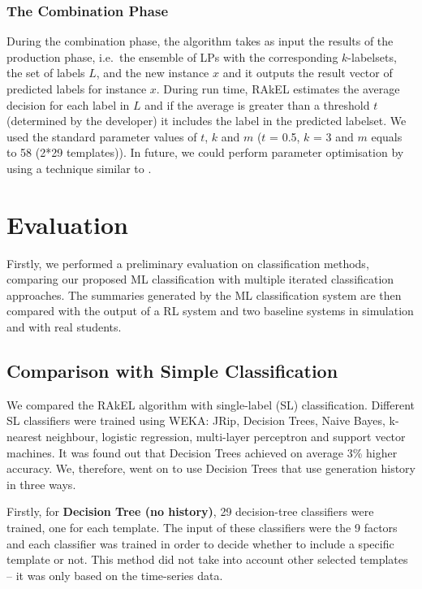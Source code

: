 \documentclass[11pt]{article}
\begin{document}
\subsubsection{The Combination Phase}

During the combination phase, the algorithm takes as input the results of the production phase, i.e.\ 
the ensemble of LPs with the corresponding $k$-labelsets, the set of labels $L$, and the new instance 
$x$ and it outputs the result vector of predicted labels for instance $x$. During run time, RAkEL 
estimates the average decision for each label in $L$ and if the average is greater than a threshold $t$
(determined by the developer) it includes the label in the predicted labelset. 
We used the standard parameter values of $t$, $k$ and $m$ ($t$ = 0.5, $k$ = 3 and $m$ 
equals to 58 (2*29 templates)). In future, we
could perform parameter optimisation by using a
technique similar to \cite{Gabsdil2004}.

\section{Evaluation} \label{evaluation}

Firstly, we performed a preliminary evaluation on classification methods,
comparing our proposed ML classification with multiple iterated
classification approaches. The summaries generated by the ML classification system are then
compared with the output of a RL system and two baseline systems
in simulation and with real students. 

\subsection{Comparison with Simple Classification}
\label{evaluation-comp}
We compared the RAkEL algorithm with single-label (SL) classification. 
Different SL classifiers were trained using WEKA: JRip, Decision Trees, Naive Bayes, k-nearest neighbour,
logistic regression, multi-layer perceptron and support vector machines. It was found out that Decision Trees 
achieved on average 3\% higher accuracy.  We, therefore, went on to use Decision Trees
that use generation history in three ways. 

Firstly, for \textbf{Decision Tree (no history)}, 29 decision-tree classifiers 
were trained, one for each template. The input of these classifiers were the 9 factors and each 
classifier was trained in order to decide whether to include a specific template or not. This method 
did not take into account other selected templates --  it was only based on the time-series data. 
\end{document}
